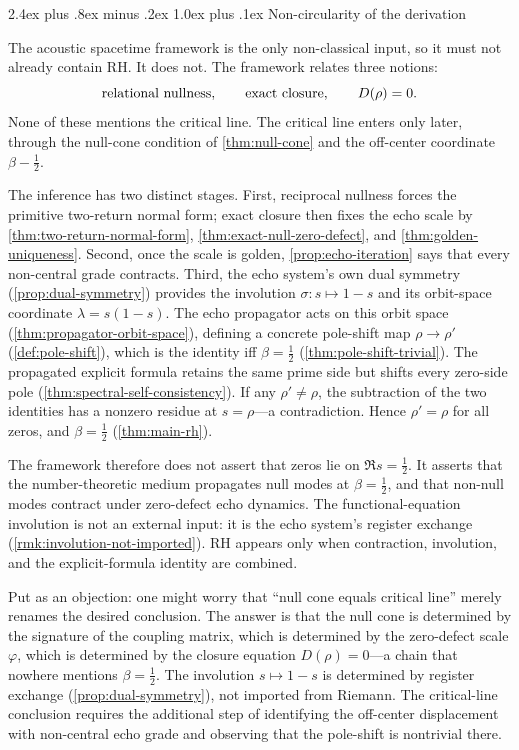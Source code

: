 \documentclass[11pt,a4paper]{article}
\makeatletter
\theoremstyle{plain}
\theoremstyle{definition}
\theoremstyle{remark}
\numberwithin{equation}{section}
\newcommand{\vp}{\varphi}
\renewcommand{\subsection}{%
  \@startsection{subsection}{2}{0pt}%
    {2.4ex plus .8ex minus .2ex}%
    {1.0ex plus .1ex}%
    {\normalfont\Large\bfseries\color{headingAccent}}%
}
\makeatother
\begin{document}
\subsection{Non-circularity of the derivation}
\label{subsec:noncircularity}

The acoustic spacetime framework is the only non-classical input, so it
must not already contain RH.  It does not.  The framework relates three
notions:
\[
  \hbox{relational nullness},\qquad
  \hbox{exact closure},\qquad
  D(\rho)=0.
\]
None of these mentions the critical line.  The critical line enters only
later, through the null-cone condition of \cref{thm:null-cone} and the
off-center coordinate \(\beta-\tfrac12\).

The inference has two distinct stages.  First, reciprocal nullness
forces the primitive two-return normal form; exact closure then fixes the
echo scale by \cref{thm:two-return-normal-form},
\cref{thm:exact-null-zero-defect}, and \cref{thm:golden-uniqueness}.
Second, once the scale is golden, \cref{prop:echo-iteration} says that
every non-central grade contracts.  Third, the echo system's own dual
symmetry (\cref{prop:dual-symmetry}) provides the involution
\(\sigma\colon s\mapsto1-s\) and its orbit-space coordinate
\(\lambda=s(1-s)\).  The echo propagator acts on this orbit space
(\cref{thm:propagator-orbit-space}), defining a concrete pole-shift
map \(\rho\to\rho'\) (\cref{def:pole-shift}), which is the identity
iff \(\beta=\tfrac12\) (\cref{thm:pole-shift-trivial}).  The
propagated explicit formula retains the same prime side but shifts
every zero-side pole (\cref{thm:spectral-self-consistency}).  If any
\(\rho'\ne\rho\), the subtraction of the two identities has a nonzero
residue at \(s=\rho\)---a contradiction.  Hence \(\rho'=\rho\) for all
zeros, and \(\beta=\tfrac12\) (\cref{thm:main-rh}).

The framework therefore does not assert that zeros lie on
\(\Re s=\tfrac12\).  It asserts that the number-theoretic medium
propagates null modes at \(\beta=\tfrac12\), and that non-null modes
contract under zero-defect echo dynamics.  The functional-equation
involution is not an external input: it is the echo system's register
exchange (\cref{rmk:involution-not-imported}).  RH appears only when
contraction, involution, and the explicit-formula identity are combined.

Put as an objection: one might worry that ``null cone equals critical
line'' merely renames the desired conclusion.  The answer is that the
null cone is determined by the signature of the coupling matrix, which
is determined by the zero-defect scale \(\vp\), which is determined by
the closure equation \(D(\rho)=0\)---a chain that nowhere mentions
\(\beta=\tfrac12\).  The involution \(s\mapsto1-s\) is determined by
register exchange (\cref{prop:dual-symmetry}), not imported from
Riemann.  The critical-line conclusion requires the additional step of
identifying the off-center displacement with non-central echo grade
and observing that the pole-shift is nontrivial there.
\end{document}
